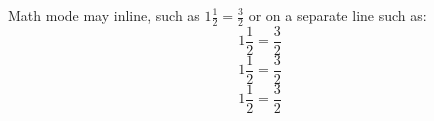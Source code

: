 \documentclass{article}
\begin{document}
Math mode may inline, such as $1\frac{1}{2} = \frac{3}{2}$ or on a separate
line such as:
$$1\frac{1}{2} = \frac{3}{2}$$
\[
1\frac{1}{2} = \frac{3}{2}
\]
\begin{equation}
1\frac{1}{2} = \frac{3}{2}
\end{equation}
\end{document}
